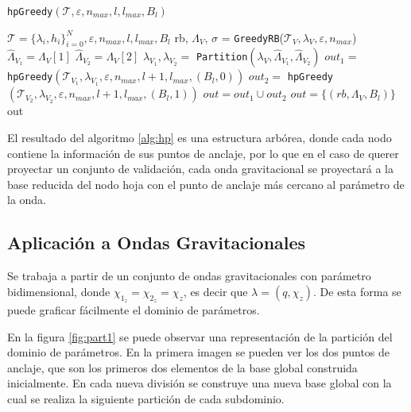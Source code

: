 
\begin{algorithm}
\caption{\texttt{hpGreedy}\((\mathcal{T}, \varepsilon, n_{max}, l, l_{max}, B_{l})\)}\label{alg:hp}
\begin{algorithmic}[1]
\Require $\mathcal{T} = \{ \lambda_{i}, h_{i} \}_{i=0}^N, \varepsilon, n_{max},l, l_{max}, B_{l}$ 
\vspace{3mm}
\State rb, $\Lambda_V$, $\sigma$ = \texttt{GreedyRB}($\mathcal{T}_V,\lambda_V, \varepsilon, n_{max}$) 
\vspace{3mm}
	\State $\hat{\Lambda}_{V_1} = \Lambda_V[1]$
	\State $\hat{\Lambda}_{V_2} = \Lambda_V[2]$
	\State $\lambda_{V_1}, \lambda_{V_2} =$ \texttt{Partition}$(\lambda_V,\hat{\Lambda}_{V_1}, \hat{\Lambda}_{V_2})$
	\State $out_1 = $ \texttt{hpGreedy}\((\mathcal{T}_{V_1}, \lambda_{V_1}, \varepsilon, n_{max}, l+1, l_{max}, (B_{l}, 0))\)
	\State $out_2 = $ \texttt{hpGreedy}\((\mathcal{T}_{V_2} ,\lambda_{V_2}, \varepsilon, n_{max}, l+1, l_{max}, (B_{l}, 1))\)
	\State $out = out_1 \cup out_2$
\Else
	\State $out = \{( rb, \Lambda_V, B_l)\}$
\EndIf
\vspace{3mm}
\Ensure out
\end{algorithmic}
\end{algorithm}

El resultado del algoritmo \ref{alg:hp} es una estructura arbórea, donde cada nodo contiene la información de sus puntos de anclaje, por lo que en el caso de querer proyectar un conjunto de validación, cada onda gravitacional se proyectará a la base reducida del nodo hoja con el punto de anclaje más cercano al parámetro de la onda.


\subsection{Aplicación a Ondas Gravitacionales}
\label{sec:hp-gw}

Se trabaja a partir de un conjunto de ondas gravitacionales con parámetro bidimensional, donde $\chi_{1_z} = \chi_{2_z} = \chi_z$, es decir que $\lambda = (q, \chi_z)$. De esta forma se puede graficar fácilmente el dominio de parámetros.



En la figura \ref{fig:part1} se puede observar una representación de la partición del dominio de parámetros. En la primera imagen se pueden ver los dos puntos de anclaje, que son los primeros dos elementos de la base global construida inicialmente. En cada nueva división se construye una nueva base global con la cual se realiza la siguiente partición de cada subdominio.


